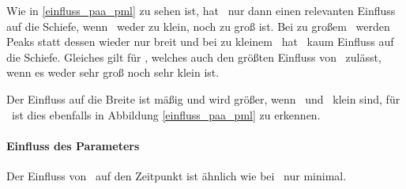 Wie in \ref{einfluss_paa_pml} zu sehen ist, hat \paa\ nur dann einen relevanten Einfluss auf die Schiefe, wenn \pml\ weder zu klein, noch zu groß ist. Bei zu großem \pml\ werden Peaks statt dessen wieder nur breit und bei zu kleinem \pml\ hat \paa\ kaum Einfluss auf die Schiefe. Gleiches gilt für \pll, welches auch den größten Einfluss von \paa\ zulässt, wenn es weder sehr groß noch sehr klein ist.

Der Einfluss auf die Breite ist mäßig und wird größer, wenn \pml\ und \pll\ klein sind, für \pml\ ist dies ebenfalls in Abbildung \ref{einfluss_paa_pml} zu erkennen.


\paragraph*{Einfluss des Parameters \pll}

Der Einfluss von \pll\ auf den Zeitpunkt ist ähnlich wie bei \pml\ nur minimal.

